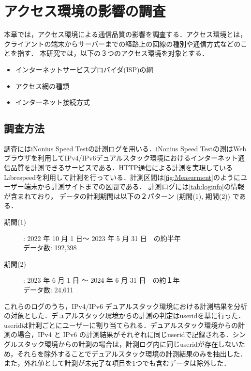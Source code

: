
\chapter{アクセス環境の影響の調査}
\label{chap:access}
本章では，アクセス環境による通信品質の影響を調査する．アクセス環境とは，クライアントの端末からサーバーまでの経路上の回線の種別や通信方式などのことを指す．
本研究では，以下の３つのアクセス環境を対象とする．
\begin{itemize}
\item インターネットサービスプロバイダ(ISP)の網
\item アクセス網の種類
\item インターネット接続方式
\end{itemize}

\section{調査方法}
調査にはiNonius Speed Test\cite{iNonius}の計測ログを用いる．iNonius Speed Testの測はWebブラウザを利用してIPv4/IPv6デュアルスタック環境におけるインターネット通信品質を計測できるサービスである．HTTP通信による計測を実現しているLibrespeed\cite{librespeed}を利用して計測を行っている．計測区間は\cref{fig:Measurment}のようにユーザー端末から計測サイトまでの区間である．
計測ログには\cref{tab:loginfo}の情報が含まれており，
データの計測期間は以下の２パターン (期間(1), 期間(2)) である．
\begin{description}
    \item[期間(1)] :  2022 年 10 月 1 日〜 2023 年 5 月 31 日　の約半年\\
    データ数: 192,398
    \item[期間(2)] :  2023 年 6 月 1 日 〜 2024 年 6 月 31 日　の約１年\\
    データ数: 24,611
\end{description}
これらのログのうち，IPv4/IPv6 デュアルスタック環境における計測結果を分析の対象とした．デュアルスタック環境からの計測の判定はuseridを基に行った．useridは計測ごとにユーザーに割り当てられる．デュアルスタック環境からの計測の場合，IPv4 と IPv6 の計測結果がそれぞれに同じuseridで記録される．シングルスタック環境からの計測の場合は，計測ログ内に同じuseridが存在しないため，それらを除外することでデュアルスタック環境の計測結果のみを抽出した．また，外れ値として計測が未完了な項目を1つでも含むデータは除外した．

